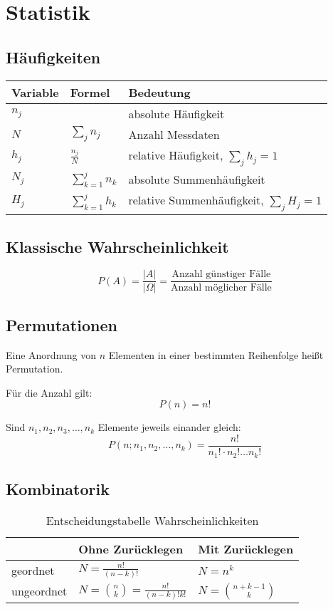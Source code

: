 \chapter{Statistik}
\section{Häufigkeiten}
\begin{table}[h]
	\begin{tabular}{lll}
		Variable & Formel & Bedeutung\\
		\toprule
		$n_j$ & & absolute Häufigkeit\\
		$N$ & $\sum\limits_j n_j$ & Anzahl Messdaten\\
		$h_j$ & $\frac{n_j}{N}$ & relative Häufigkeit, $\sum\limits_j h_j = 1$\\
		$N_j$ & $\sum\limits_{k=1}^{j} n_k$ & absolute Summenhäufigkeit\\
		$H_j$ & $\sum\limits_{k=1}^{j} h_k$ & relative Summenhäufigkeit, $\sum\limits_j H_j = 1$\\
	\end{tabular}
\end{table}

\section{Klassische Wahrscheinlichkeit}
\begin{equation}
P(A) = \frac{|A|}{|\Omega|} = \frac{\text{Anzahl günstiger Fälle}}{\text{Anzahl möglicher Fälle}}
\end{equation}

\section{Permutationen}
Eine Anordnung von $n$ Elementen in einer bestimmten Reihenfolge heißt Permutation.

Für die Anzahl gilt:
\begin{equation}
	P(n) = n!
\end{equation}

Sind $n_1, n_2, n_3, \dots, n_k$ Elemente jeweils einander gleich:\\
\begin{equation}
	P(n; n_1,n_2,\dots,n_k) = \frac{n!}{n_1!\cdot n_2!\dots n_k!}
\end{equation}

\section{Kombinatorik}
\begin{table}[h]
	\begin{tabular}{l|ll}
				& Ohne Zurücklegen & Mit Zurücklegen \\
		\toprule
		geordnet	& $N=\frac{n!}{(n-k)!}$ & $N=n^k$\\
		\midrule
		ungeordnet	& $N=\binom{n}{k}=\frac{n!}{(n-k)!k!}$ & $N=\binom{n+k-1}{k}$
	\end{tabular}
	\caption{Entscheidungstabelle Wahrscheinlichkeiten}
\end{table}

